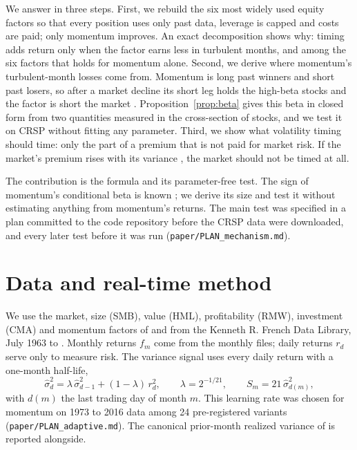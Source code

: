 \documentclass[11pt]{article}
\begin{document}
We answer in three steps. First, we rebuild the six most widely used equity factors so that every position uses only past data, leverage is capped and costs are paid; only momentum improves. An exact decomposition shows why: timing adds return only when the factor earns less in turbulent months, and among the six factors that holds for momentum alone. Second, we derive where momentum's turbulent-month losses come from. Momentum is long past winners and short past losers, so after a market decline its short leg holds the high-beta stocks and the factor is short the market \citep{grundy2001,daniel2016}. Proposition~\ref{prop:beta} gives this beta in closed form from two quantities measured in the cross-section of stocks, and we test it on CRSP without fitting any parameter. Third, we show what volatility timing should time: only the part of a premium that is not paid for market risk. If the market's premium rises with its variance \citep{merton1980}, the market should not be timed at all.

The contribution is the formula and its parameter-free test. The sign of momentum's conditional beta is known \citep{grundy2001,daniel2016}; we derive its size and test it without estimating anything from momentum's returns. The main test was specified in a plan committed to the code repository before the CRSP data were downloaded, and every later test before it was run (\texttt{paper/PLAN\_mechanism.md}).

\section{Data and real-time method}

We use the market, size (SMB), value (HML), profitability (RMW), investment (CMA) and momentum factors of \citet{fama2015} and \citet{carhart1997} from the Kenneth R. French Data Library, July 1963 to \RTend{}. Monthly returns $f_m$ come from the monthly files; daily returns $r_d$ serve only to measure risk. The variance signal uses every daily return with a one-month half-life,
\begin{equation}
\hat\sigma^2_d=\lambda\,\hat\sigma^2_{d-1}+(1-\lambda)\,r_d^2,\qquad \lambda=2^{-1/21},\qquad S_m=21\,\hat\sigma^2_{d(m)},
\label{eq:ewma}
\end{equation}
with $d(m)$ the last trading day of month $m$. This learning rate was chosen for momentum on 1973 to 2016 data among 24 pre-registered variants (\texttt{paper/PLAN\_adaptive.md}). The canonical prior-month realized variance of \citet{moreira2017} is reported alongside.
\end{document}
